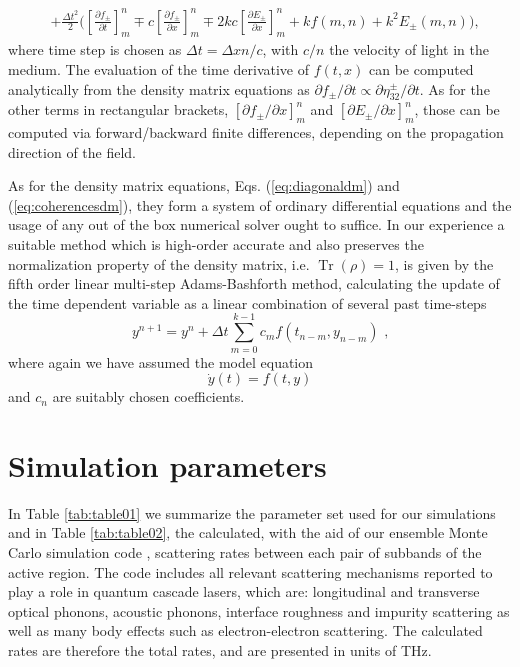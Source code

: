 \documentclass[twocolumn,secnumarabic,amssymb, nobibnotes, aps, prd]{revtex4-1}
\def\p{\partial}
\DeclareMathOperator{\Tr}{Tr}
\begin{document}
{\begin{appendices}
\begin{align}
				& + \frac{\Delta t^2} {2} \Bigg ( \left [  \frac{\partial f_{\pm} }{\partial t} \right]_m^n \mp  c \left [  \frac{\partial f_{\pm} }{\partial x} \right]_m^n 
				\mp 2kc \left[ \frac{\partial E_{\pm} }{\partial x} \right]_m^n  + kf(m,n) + k^2 E_{\pm} (m,n) \Bigg ),
				\end{align} 
				where time step is chosen as $\Delta t = \Delta x n/c$, with $c/n$ the velocity of light in the medium. The evaluation of the time derivative of $f(t,x)$ can be computed analytically from the density matrix equations as $\p f_{\pm}/\p t \propto \p \eta_{32}^{\pm}/\p t$. As for the other terms in rectangular brackets, $\left [ \partial f_{\pm} /\partial x \right]_m^n$ and  $\left[ \partial E_{\pm}/\partial x \right]_m^n$, those can be computed via forward/backward finite differences, depending on the propagation direction of the field. 
				
				As for the density matrix equations, Eqs. (\ref{eq:diagonaldm}) and (\ref{eq:coherencesdm}), they form a system of ordinary differential equations and the usage of any out of the box numerical solver ought to suffice. In our experience a suitable method which is high-order accurate and also preserves the normalization property of the density matrix, i.e. $\Tr(\rho) = 1$, is given by the fifth order linear multi-step Adams-Bashforth method, calculating the update of the time dependent variable as a linear combination of several past time-steps
				\begin{equation}
				\label{eq:adams-bashforth}
				y^{n+1} = y^{n} + \Delta t \sum\limits_{m = 0}^{k-1} c_m f(t_{n-m},y_{n-m}) \text{	,}
				\end{equation}
				where again we have assumed the model equation
				\begin{equation}
				\label{eq:adams-bashforth-model}
				\dot{y}(t) =f(t,y)
				\end{equation}
				and $c_n$ are suitably chosen coefficients. 
				
				\section{Simulation parameters}
				\label{sec:params}
				In Table \ref{tab:table01} we summarize the parameter set used for our simulations and in Table \ref{tab:table02}, the calculated, with the aid of our ensemble Monte Carlo simulation code \cite{jirauschek2014modeling}, scattering rates between each pair of subbands of the active region. The code includes all relevant scattering mechanisms reported to play a role in quantum cascade lasers, which are: longitudinal and transverse optical phonons, acoustic phonons, interface roughness and impurity scattering as well as many body effects such as electron-electron scattering. The calculated rates are therefore the total rates, and are presented in units of THz.
				

\end{appendices}}
\end{document}
